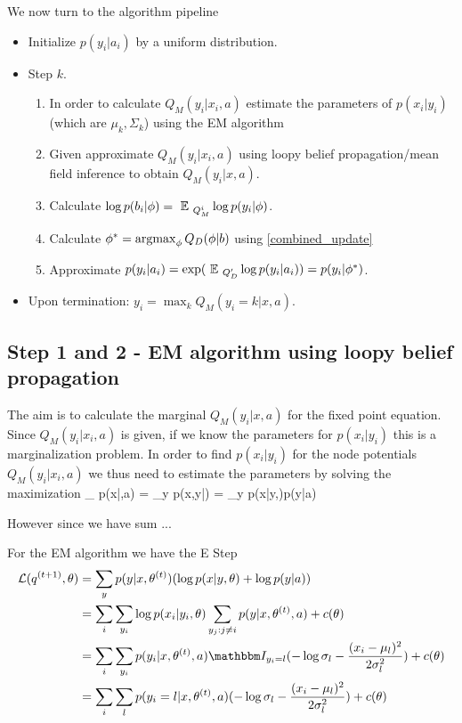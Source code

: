 \documentclass{article} %
\begin{document}
We now turn to the algorithm pipeline
\begin{itemize}
\item Initialize $p(y_i|a_i)$ by a uniform distribution.
\item Step $k$.
\begin{enumerate}
\item In order to calculate $Q_M(y_i|x_i,a)$ estimate the parameters of $p(x_i|y_i)$ (which are $\mu_k,\Sigma_k$) using the EM algorithm %
\item Given approximate $Q_M(y_i|x_i,a)$ using loopy belief propagation/mean field inference to obtain $Q_M(y_i|x,a)$.
\item Calculate $\log p(b_i|\phi) = \mbox{ }\mathbb{E}\mbox{ }_{Q_M^i} \log p(y_i|\phi)$.
\item Calculate $\phi^* = \operatorname*{argmax}_{\phi} Q_D(\phi|b)$ using \eqref{combined_update}
\item Approximate $p(y_i|a_i) = \exp(\mbox{ }\mathbb{E}\mbox{ }_{Q'_D} \log p(y_i|a_i))= p(y_i|\phi^*)$.
\end{enumerate} 
\item Upon termination: $y_i = \max_k Q_M(y_i = k|x,a)$. 
\end{itemize}

\subsection{Step 1 and 2 - EM algorithm using loopy belief propagation}
The aim is to calculate the marginal $Q_M(y_i|x,a)$ for the fixed point equation. Since $Q_M(y_i|x_i,a)$ is given, if we know the parameters for $p(x_i|y_i)$ this is a marginalization problem. In order to find $p(x_i|y_i)$ for the node potentials $Q_M(y_i|x_i,a)$ we thus need to estimate the parameters by solving the maximization
\beqs
\max_{\theta} \log p(x|\theta,a) = \log \sum_y p(x,y|\theta) = \log \sum_y p(x|y,\theta)p(y|a)
\eeqs

However since we have sum ...

For the EM algorithm we have the E Step
\begin{align*}
\L(q^{(t+1)},\theta) &= \sum_y p(y|x,\theta^{(t)}) (\log p(x|y,\theta) + \log p(y|a)) \\
&= \sum_i \sum_{y_i} \log p(x_i|y_i,\theta) \sum_{y_j:j\neq i} p(y|x,\theta^{(t)},a) + c(\theta)\\
&= \sum_i \sum_{y_i} p(y_i|x, \theta^{(t)},a) \Indi_{y_i=l} (-\log \sigma_l - \frac{(x_i -\mu_l)^2}{2\sigma_l^2}) + c(\theta)\\
&= \sum_i \sum_l p(y_i = l|x,\theta^{(t)},a) (-\log \sigma_l -  \frac{(x_i -\mu_l)^2}{2\sigma_l^2}) + c(\theta)
\end{align*}
\end{document}
